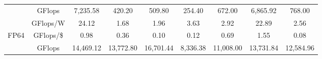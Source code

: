 \begin{table}[h]
\begin{adjustwidth}{-1.5in}{-1.5in}
\begin{center}
{\begin{tabular}{cc||c|c|c|c|c|c|c}
                                  &  GFlops                                                                                 & 7,235.58                                                        & 420.20                                                           & 509.80                                                               & 254.40                                                        & 672.00                                                               & 6,865.92                                                               & 768.00                                                                 \\
                                  & \cellcolor[HTML]{EFEFEF}GFlops/W                                                       & \cellcolor[HTML]{EFEFEF}24.12                                   & \cellcolor[HTML]{EFEFEF}1.68                                     & \cellcolor[HTML]{EFEFEF}1.96                                         & \cellcolor[HTML]{EFEFEF}3.63                                  & \cellcolor[HTML]{EFEFEF}2.92                                         & \cellcolor[HTML]{EFEFEF}22.89                                          & \cellcolor[HTML]{EFEFEF}2.56                                           \\
\multirow{-3}{*}{FP64}            & GFlops/\$                                                                              & 0.98                                                            & 0.36                                                             & 0.10                                                                 & 0.12                                                          & 0.69                                                                 & 1.55                                                                   & 0.08                                                                   \\ \hline
                                  & \cellcolor[HTML]{EFEFEF}GFlops                                                         & \cellcolor[HTML]{EFEFEF}14,469.12                               & \cellcolor[HTML]{EFEFEF}13,772.80                                & \cellcolor[HTML]{EFEFEF}16,701.44                                    & \cellcolor[HTML]{EFEFEF}8,336.38                              & \cellcolor[HTML]{EFEFEF}11,008.00                                    & \cellcolor[HTML]{EFEFEF}13,731.84                                      & \cellcolor[HTML]{EFEFEF}12,584.96                                      \\

\end{tabular}}
\end{center}
\end{adjustwidth}
\end{table}
